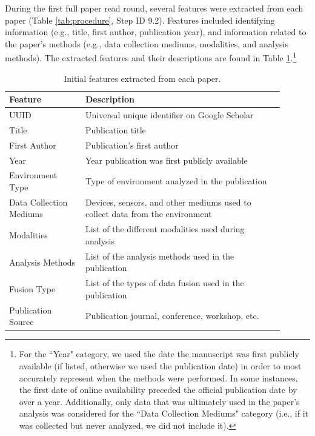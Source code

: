 \documentclass[manuscript,screen,review]{acmart}
\begin{document}
During the first full paper read round, several features were extracted from each paper (Table \ref{tab:procedure}, Step ID 9.2). Features included identifying information (e.g., title, first author, publication year), and information related to the paper's methods (e.g., data collection mediums, modalities, and analysis methods). The extracted features and their descriptions are found in Table \ref{tab:feature_extraction}.\footnote{For the ``Year" category, we used the date the manuscript was first publicly available (if listed, otherwise we used the publication date) in order to most accurately represent when the methods were performed. In some instances, the first date of online availability preceded the official publication date by over a year. Additionally, only data that was ultimately used in the paper's analysis was considered for the ``Data Collection Mediums" category (i.e., if it was collected but never analyzed, we did not include it).}

\begin{table}[htbp]
    \renewcommand{\arraystretch}{1.3}%
    \centering
    \caption{Initial features extracted from each paper.}
    \begin{tabular}{p{0.25\linewidth}@{\hskip .1in} | @{\hskip .1in}p{0.65\linewidth}@{\hskip .1in}}
        \toprule
        Feature & Description\\
        
        \toprule
        UUID & Universal unique identifier on Google Scholar \\

        Title & Publication title \\

        First Author & Publication's first author \\

        Year & Year publication was first publicly available \\

        Environment Type & Type of environment analyzed in the publication \\

        Data Collection Mediums & Devices, sensors, and other mediums used to collect data from the environment \\

        Modalities & List of the different modalities used during analysis \\

        Analysis Methods & List of the analysis methods used in the publication \\

        Fusion Type & List of the types of data fusion used in the publication \\

        Publication Source & Publication journal, conference, workshop, etc. \\
        
        \bottomrule
    \end{tabular}
    \label{tab:feature_extraction}
\end{table}
\end{document}
